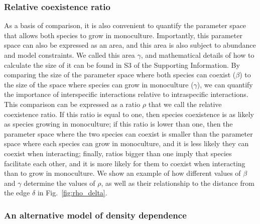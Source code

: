 \begin{refsection}
\subsubsection{Relative coexistence ratio}

As a basis of comparison, it is also convenient to quantify the parameter space that allows both species to grow in monoculture. Importantly, this parameter space can also be expressed as an area, and this area is also subject to abundance and model constraints. We called this area $\gamma$, and mathematical details of how to calculate the size of it can be found in S3 of the Supporting Information. By comparing the size of the parameter space where both species can coexist ($\beta$) to the size of the space where species can grow in monoculture ($\gamma$), we can quantify the importance of interspecific interactions relative to intraspecific interactions. This comparison can be expressed as a ratio $\rho$ that we call the relative coexistence ratio. If this ratio is equal to one, then species coexistence is as likely as species growing in monoculture; if this ratio is lower than one, then the parameter space where the two species can coexist is smaller than the parameter space where each species can grow in monoculture,  and it is less likely they can coexist when interacting; finally, ratios bigger than one imply that species facilitate each other, and it is more likely for them to coexist when interacting than to grow in monoculture. We show an example of how different values of $\beta$ and $\gamma$ determine the values of $\rho$, as well as their relationship to the distance from the edge $\delta$ in Fig.~\ref{fig:rho_delta}.

\subsubsection{An alternative model of density dependence}



\end{refsection}
